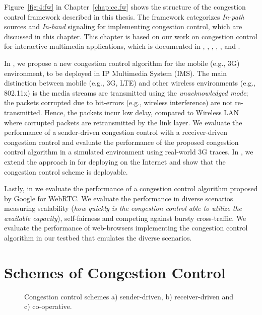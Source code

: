 Figure~\ref{fig:4:fw} in Chapter~\ref{chap:cc.fw} shows the structure of the
congestion control framework described in this thesis. The framework
categorizes \emph{In-path} sources and \emph{In-band} signaling for
implementing congestion control, which are discussed in this chapter. This
chapter is based on our work on congestion control for interactive multimedia
applications, which is documented in , ,
, \cite{draft.xr.discard.rle},
\cite{draft.xr.bytes.discarded}, \cite{singh:2010.thesis} and
\cite{Singh:control.loops.api}.

In , we propose a new congestion control algorithm for the
mobile (e.g., 3G) environment, to be deployed in IP Multimedia System (IMS).
The main distinction between mobile (e.g., 3G, LTE) and other wireless
environments (e.g., 802.11x) is the media streams are transmitted using the
\emph{unacknowledged mode}; the packets corrupted due to bit-errors (e.g.,
wireless interference) are not re-transmitted. Hence, the packets incur low
delay, compared to Wireless LAN where corrupted packets are retransmitted by
the link layer. We evaluate the performance of a sender-driven congestion
control with a receiver-driven congestion control and evaluate the performance
of the proposed congestion control algorithm in a simulated environment using
real-world 3G traces. In , we extend the approach in
 for deploying on the Internet and show that the congestion
control scheme is deployable.

Lastly, in  we evaluate the performance of a congestion
control algorithm proposed by Google for WebRTC. We evaluate the performance
in diverse scenarios measuring scalability (\emph{how quickly is the
congestion control able to utilize the available capacity}), self-fairness and
competing against bursty cross-traffic. We evaluate the performance of
web-browsers implementing the congestion control algorithm in our testbed that
emulates the diverse scenarios.

\section{Schemes of Congestion Control}

\begin{figure}
  \centerline{
  }
  \centerline{
  }
  \centerline{
  }
  \caption{Congestion control schemes a) sender-driven, b) receiver-driven
and c) co-operative.}
  \label{fig:cc:scheme}
\end{figure}

